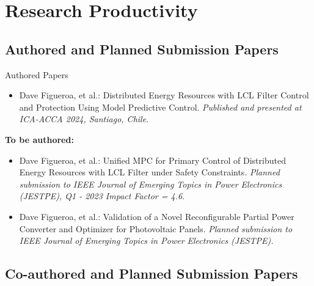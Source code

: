 \section{Research Productivity}

\subsection{Authored and Planned Submission Papers}

\begin{frame}{Authored Papers}
    \begin{itemize}
        \item Dave Figueroa, et al.: Distributed Energy Resources with LCL Filter Control and Protection Using Model Predictive Control. \textit{Published and presented at ICA-ACCA 2024, Santiago, Chile.}
    \end{itemize}
    \textbf{To be authored:}
    \begin{itemize}
        \item Dave Figueroa, et al.: Unified MPC for Primary Control of Distributed Energy Resources with LCL Filter under Safety Constraints. \textit{Planned submission to IEEE Journal of Emerging Topics in Power Electronics (JESTPE), Q1 - 2023 Impact Factor = 4.6}\footnotemark[1].
        \item Dave Figueroa, et al.: Validation of a Novel Reconfigurable Partial Power Converter and Optimizer for Photovoltaic Panels. \textit{Planned submission to IEEE Journal of Emerging Topics in Power Electronics (JESTPE).}
    \end{itemize}
\end{frame}

\subsection{Co-authored and Planned Submission Papers}


